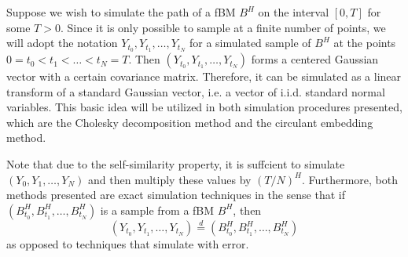 Suppose we wish to simulate the path of a fBM $B^{H}$ on the interval $[0,T]$ for some $T>0$. Since it is only possible to sample at a finite number of points, we will adopt the notation $Y_{t_{0}},Y_{t_{1}},\dots,Y_{t_{N}}$ for a simulated sample of $B^H$ at the points $0=t_{0}<t_{1}<\dots<t_{N}=T$. Then $(Y_{t_{0}},Y_{t_{1}},\dots,Y_{t_{N}})$ forms a centered Gaussian vector with a certain covariance matrix. Therefore, it can be simulated as a linear transform of a standard Gaussian vector, i.e. a vector of i.i.d. standard normal variables. This basic idea will be utilized in both simulation procedures presented, which are the Cholesky decomposition method and the circulant embedding method. 

Note that due to the self-similarity property, it is suffcient to simulate $(Y_{0},Y_{1},\dots, Y_{N})$ and then multiply these values by $(T/N)^H$. Furthermore, both methods presented are exact simulation techniques in the sense that if $(B_{t_{0}}^{H},B_{t_{1}}^{H},\dots, B_{t_{N}}^{H})$ is a sample from a fBM $B^H$, then 
\begin{equation}
    (Y_{t_{0}},Y_{t_{1}},\dots,Y_{t_{N}}) \overset{d}{=}(B_{t_{0}}^{H},B_{t_{1}}^{H},\dots, B_{t_{N}}^{H})
\end{equation}
as opposed to techniques that simulate with error.

